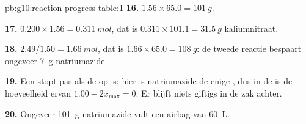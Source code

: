 \begin{solution}{pb:g10:reaction-progress-table:1}
\textbf{16.} $1.56 \times 65.0 = \qty{101}{g}$.

\textbf{17.} $0.200 \times 1.56 = \qty{0.311}{mol}$, dat is
$0.311 \times 101.1 = \qty{31.5}{g}$ kaliumnitraat.

\textbf{18.} $2.49 / 1.50 = \qty{1.66}{mol}$, dat is
$1.66 \times 65.0 = \qty{108}{g}$: de tweede reactie bespaart ongeveer
\qty{7}{g} natriumazide.

\textbf{19.} Een  stopt pas als de 
op is; hier is natriumazide de enige , dus in de  is
de hoeveelheid ervan $1.00 - 2x_{\max} = 0$. Er blijft niets giftigs in
de zak achter.

\textbf{20.} Ongeveer \qty{101}{g} natriumazide vult een airbag van
\qty{60}{L}.
\end{solution}
